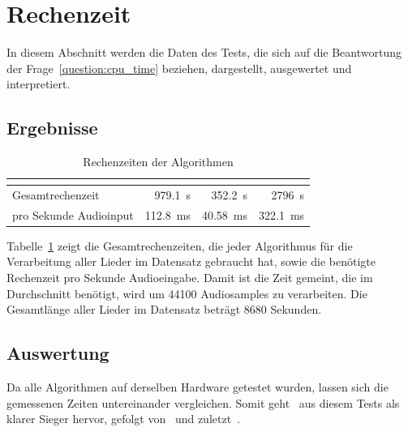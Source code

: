 \section{Rechenzeit}
{
	In diesem Abschnitt werden die Daten des Tests,
		die sich auf die Beantwortung der Frage~\ref{question:cpu_time} beziehen,
 		dargestellt, ausgewertet und interpretiert.

	\subsection{Ergebnisse}
	{
		\begin{table}[h]
			\centering
			\begin{tabular}{l | r | r | r}
				                       & \cite{2001_BeatThis} & \cite{2009_DaPlSt}   & \cite{2011_PlRoSt} \\
				\hline \hline
				Gesamtrechenzeit       & \SI{979.1}{\second}  & \SI{352.2}{\second} & \SI{2796}{\second} \\
				pro Sekunde Audioinput & \SI{112.8}{\milli\second} & \SI{40.58}{\milli\second} & \SI{322.1}{\milli\second}
			\end{tabular}
			\caption{Rechenzeiten der Algorithmen}
			\label{tab:cputime}
		\end{table}

		Tabelle~\ref{tab:cputime} zeigt die Gesamtrechenzeiten,
			die jeder Algorithmus für die Verarbeitung aller Lieder im Datensatz gebraucht hat,
			sowie die benötigte Rechenzeit pro Sekunde Audioeingabe.
		Damit ist die Zeit gemeint,
			die im Durchschnitt benötigt,
			wird um \num{44100} Audiosamples zu verarbeiten.
		Die Gesamtlänge aller Lieder im Datensatz beträgt \num{8680} Sekunden.
	}

	\subsection{Auswertung}
	{
		Da alle Algorithmen auf derselben Hardware getestet wurden,
			lassen sich die gemessenen Zeiten untereinander vergleichen.
		Somit geht~\cite{2009_DaPlSt} aus diesem Tests als klarer Sieger hervor,
			gefolgt von~\cite{2001_BeatThis} und zuletzt~\cite{2011_PlRoSt}.

}}
